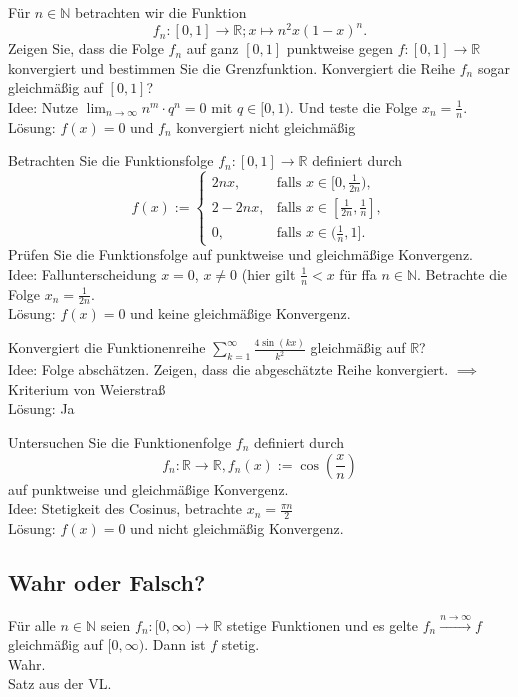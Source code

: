 \documentclass[parskip=full]{scrartcl}
\begin{document}
Für $n \in \mathbb{N}$ betrachten wir die Funktion
\begin{displaymath}
  f_n: [0,1] \to \mathbb{R}; x \mapsto n^2x(1-x)^n.
\end{displaymath}
Zeigen Sie, dass die Folge $f_n$ auf ganz $[0,1]$ punktweise gegen $f : [0,1] \to \mathbb{R}$ konvergiert und bestimmen Sie die Grenzfunktion.
Konvergiert die Reihe $f_n$ sogar gleichmäßig auf $[0,1]$?\\
Idee: Nutze $\lim_{n \to \infty} n^m \cdot q^n = 0$ mit $q \in [0,1)$. Und teste die Folge $x_n = \frac{1}{n}$.\\
Lösung: $f(x) = 0$ und $f_n$ konvergiert nicht gleichmäßig

Betrachten Sie die Funktionsfolge $f_n:[0,1] \to \mathbb{R}$ definiert durch
\begin{displaymath}
  f(x) := 
  \begin{cases}
    2nx,& \text{falls } x \in [0,\frac{1}{2n}),\\
    2 - 2nx,& \text{falls } x \in [\frac{1}{2n}, \frac{1}{n}],\\
    0,& \text{falls } x \in (\frac{1}{n}, 1].
  \end{cases}
\end{displaymath}
Prüfen Sie die Funktionsfolge auf punktweise und gleichmäßige Konvergenz.\\
Idee: Fallunterscheidung $x = 0$, $x \neq 0$ (hier gilt $\frac{1}{n} < x$ für ffa $n \in \mathbb{N}$.
Betrachte die Folge $x_n = \frac{1}{2n}$.\\
Lösung: $f(x) = 0$ und keine gleichmäßige Konvergenz.

Konvergiert die Funktionenreihe $\sum_{k = 1}^{\infty} \frac{4 \sin(kx)}{k^2}$ gleichmäßig auf $\mathbb{R}$?\\
Idee: Folge abschätzen. Zeigen, dass die abgeschätzte Reihe konvergiert. $\implies$ Kriterium von Weierstraß\\
Lösung: Ja

Untersuchen Sie die Funktionenfolge $f_n$ definiert durch
\begin{displaymath}
  f_n : \mathbb{R} \to \mathbb{R}, f_n(x) := \cos\left(\frac{x}{n}\right)
\end{displaymath}
auf punktweise und gleichmäßige Konvergenz.\\
Idee: Stetigkeit des Cosinus, betrachte $x_n = \frac{\pi n}{2}$\\
Lösung: $f(x) = 0$ und nicht gleichmäßig Konvergenz.

\subsection{Wahr oder Falsch?}
Für alle $n \in \mathbb{N}$ seien $f_n : [0, \infty) \to \mathbb{R}$ stetige Funktionen und es gelte $f_n \xrightarrow{n \to \infty} f$ gleichmäßig auf $[0,\infty)$. Dann ist $f$ stetig.\\
Wahr.\\
Satz aus der VL.
\end{document}
